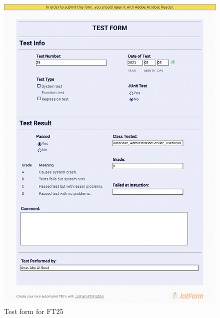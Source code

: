 \documentclass{article}
\begin{document}
 \begin{figure}
     \centering
     \includegraphics[width=13cm]{images/2021-03-03_Anas_FT25-1}
     \renewcommand\figurename{Figure}
     \caption{Test form for FT25}
     \label{fig:my_label}
 \end{figure}
 
\end{document}
